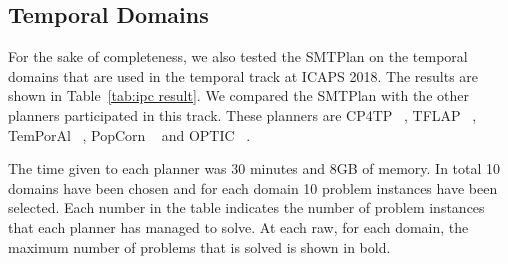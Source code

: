 \subsection{Temporal Domains}\label{sec:eval_pddl21}

For the sake of completeness, we also tested the SMTPlan on the temporal domains that are used in the temporal track at ICAPS 2018. The results are shown in Table~\ref{tab:ipc result}. We compared the SMTPlan with the other planners participated in this track. These planners are CP4TP  ~\cite{cp4tp}, TFLAP  ~\cite{tflap}, TemPorAl  ~\cite{temporal}, PopCorn  ~\cite{popcorn} and OPTIC  ~\cite{OPTIC}. 

The time given to each planner was 30 minutes and 8GB of memory. In total 10 domains have been chosen and for each domain 10 problem instances have been selected. Each number in the table indicates the number of problem instances that each planner has managed to solve. At each raw, for each domain, the maximum number of problems that is solved is shown in bold. 



